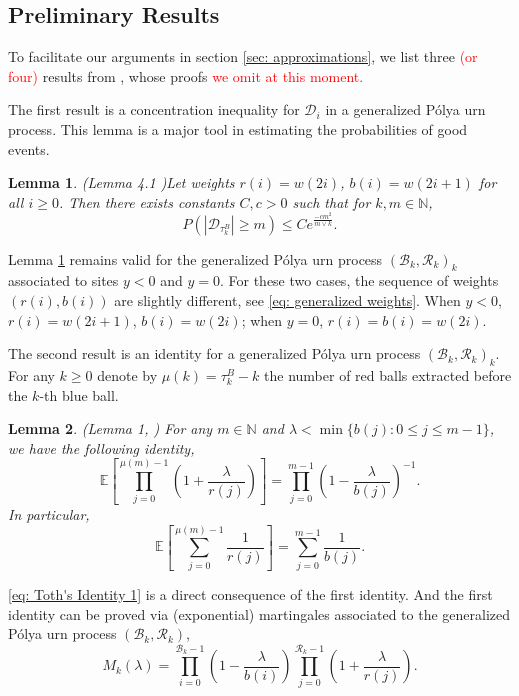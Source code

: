 \documentclass[twoside,12pt,a4paper]{article}
\newtheorem{lemma}{Lemma}[section]
\numberwithin{equation}{section}
\newcommand{\abs}[1]{\left\vert #1 \right\vert}
\begin{document}
{\subsection{Preliminary Results}
To facilitate our arguments in section \ref{sec: approximations}, we list three \textcolor{red}{(or four)} results from \cite{KMP22,T96}, whose proofs \textcolor{red}{we omit at this moment.}

The first result is a concentration inequality for $\mathcal{D}_i$ in a generalized P\'{o}lya urn process. This lemma is a major tool in estimating the probabilities of good events.
\begin{lemma}(Lemma 4.1 \cite{KMP22})\label{lm: concentration inequality}
	Let weights $r(i) = w(2i)$, $b(i)= w(2i+1) $ for all $i\geq 0$. Then there exists constants $C,c>0$ such that for $k, m \in \mathbb{N}$,
	$$
	P\left(  \abs{ \mathcal{D}_{\tau_k^B}   } \geq m \right) \leq C e^{\frac{-cm^2}{m \vee k}}.
	$$
\end{lemma} 
Lemma \ref{lm: concentration inequality} remains valid for the generalized P\'{o}lya urn process $(\mathcal{B}_{k},\mathcal{R}_{k})_k$ associated to sites $y<0$ and $y=0$. For these two cases, the sequence of weights $(r(i),b(i))$ are slightly different, see \eqref{eq: generalized weights}. When $y<0$, $r(i) = w(2i+1)$, $b(i)= w(2i) $; when $y=0$, $r(i) = b(i)=w(2i)$.

The second result is an identity for a generalized P\'{o}lya urn process $(\mathcal{B}_{k},\mathcal{R}_{k})_k$. For any $k\geq 0$ denote by $\mu(k)= \tau^B_k - k$ the number of red balls extracted before the $k$-th blue ball. 
\begin{lemma}(Lemma 1, \cite{T96}) \label{lm: Toth's Identity}
	For any $m\in \mathbb{N}$ and $\lambda < \min\{ b(j): 0\leq j\leq m-1 \}$, we have the following identity,
	$$  \mathbb{E}\left[  \prod_{j=0}^{ \mu(m)-1 } \left(1+ \frac{\lambda}{r(j)}   \right) \right] =   \prod_{j=0}^{ m-1 } \left(1- \frac{\lambda}{b(j)}   \right)^{-1}.   $$ 
	In particular, 
	\begin{equation}\label{eq: Toth's Identity 1}
		\mathbb{E}\left[  \sum_{j=0}^{ \mu(m)-1 } \frac{1}{r(j)}   \right] =   \sum_{j=0}^{ m-1 } \frac{1}{b(j)}.
	\end{equation}	
\end{lemma}
\eqref{eq: Toth's Identity 1} is a direct consequence of the first identity. And the first identity can be proved via (exponential) martingales associated to the generalized P\'{o}lya urn process $(\mathcal{B}_{k},\mathcal{R}_{k})$, 
$$M_k(\lambda) = \prod_{i=0}^{ \mathcal{B}_{k}-1 } \left(1-\frac{\lambda}{b(i)}\right) \prod_{j=0}^{\mathcal{R}_{k}-1 } \left(1+\frac{\lambda}{r(j)}\right). $$

}
\end{document}
